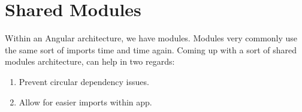 \chapter{ Shared Modules }
Within an Angular architecture, we have modules. Modules very commonly use the same 
sort of imports time and time again. Coming up with a sort of shared modules 
architecture, can help in two regards: 

\begin{enumerate}
  \item Prevent circular dependency issues.
  \item Allow for easier imports within app.
\end{enumerate}

\section{}
